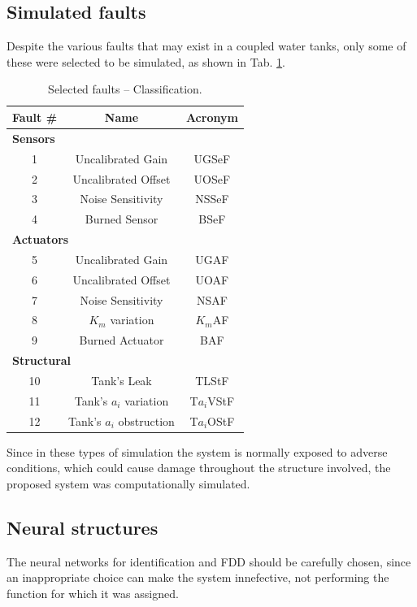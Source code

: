 \documentclass[10pt,fleqn,a4paper]{article}
\begin{document}
\subsection{Simulated faults}
Despite the various faults that may exist in a coupled water tanks, only some of
these were selected to be simulated, as shown in Tab. \ref{tab:faults}.

\begin{table}[!htb]
\centering
\caption{Selected faults -- Classification.}
\label{tab:faults}
\begin{tabular}{|c|c|c|}
\hline
{\bf Fault \#} & {\bf Name} & {\bf Acronym}\\
\hline
\multicolumn{3}{|l|}{\bf Sensors}\\
\hline
1 & Uncalibrated Gain & UGSeF\\
\hline
2 & Uncalibrated Offset & UOSeF\\
\hline
3 & Noise Sensitivity & NSSeF\\
\hline
4 & Burned Sensor & BSeF\\
\hline
\multicolumn{3}{|l|}{\bf Actuators}\\
\hline
5 & Uncalibrated Gain & UGAF\\
\hline
6 & Uncalibrated Offset & UOAF\\
\hline
7 & Noise Sensitivity & NSAF\\
\hline
8 & $K_m$ variation & $K_m$AF\\
\hline
9 & Burned Actuator & BAF\\
\hline
\multicolumn{3}{|l|}{\bf Structural}\\
\hline
10 & Tank's Leak & TLStF\\
\hline
11 & Tank's $a_i$ variation & T$a_i$VStF\\
\hline
12 & Tank's $a_i$ obstruction & T$a_i$OStF\\
\hline
\end{tabular}
\end{table}

Since in these types of simulation the system is normally exposed to adverse
conditions, which could cause damage throughout the structure involved, the
proposed system was computationally simulated.

\subsection{Neural structures}
The neural networks for identification and FDD should be carefully chosen, since
an inappropriate choice can make the system innefective, not performing the
function for which it was assigned.
\end{document}
